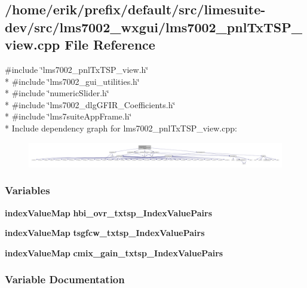 \subsection{/home/erik/prefix/default/src/limesuite-\/dev/src/lms7002\+\_\+wxgui/lms7002\+\_\+pnl\+Tx\+T\+S\+P\+\_\+view.cpp File Reference}
\label{lms7002__pnlTxTSP__view_8cpp}
{\ttfamily \#include \char`\"{}lms7002\+\_\+pnl\+Tx\+T\+S\+P\+\_\+view.\+h\char`\"{}}\\*
{\ttfamily \#include \char`\"{}lms7002\+\_\+gui\+\_\+utilities.\+h\char`\"{}}\\*
{\ttfamily \#include \char`\"{}numeric\+Slider.\+h\char`\"{}}\\*
{\ttfamily \#include \char`\"{}lms7002\+\_\+dlg\+G\+F\+I\+R\+\_\+\+Coefficients.\+h\char`\"{}}\\*
{\ttfamily \#include \char`\"{}lms7suite\+App\+Frame.\+h\char`\"{}}\\*
Include dependency graph for lms7002\+\_\+pnl\+Tx\+T\+S\+P\+\_\+view.\+cpp\+:
\nopagebreak
\begin{figure}[H]
\begin{center}
\leavevmode
\includegraphics[width=350pt]{d7/d91/lms7002__pnlTxTSP__view_8cpp__incl}
\end{center}
\end{figure}
\subsubsection*{Variables}
\begin{DoxyCompactItemize}
\item 
{\bf index\+Value\+Map} {\bf hbi\+\_\+ovr\+\_\+txtsp\+\_\+\+Index\+Value\+Pairs}
\item 
{\bf index\+Value\+Map} {\bf tsgfcw\+\_\+txtsp\+\_\+\+Index\+Value\+Pairs}
\item 
{\bf index\+Value\+Map} {\bf cmix\+\_\+gain\+\_\+txtsp\+\_\+\+Index\+Value\+Pairs}
\end{DoxyCompactItemize}


\subsubsection{Variable Documentation}
